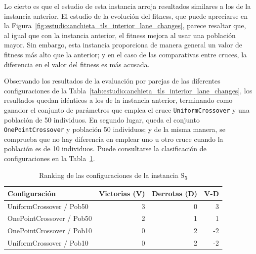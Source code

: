 Lo cierto es que el estudio de esta instancia arroja resultados similares a los de la instancia anterior. El estudio de la evolución del fitness, que puede apreciarse en la Figura~\ref{fig:estudio:anchieta_tls_interior_lane_changes}, parece resaltar que, al igual que con la instancia anterior, el fitness mejora al usar una población mayor. Sin embargo, esta instancia proporciona de manera general un valor de fitness más alto que la anterior; y en el caso de las comparativas entre cruces, la diferencia en el valor del fitness es más acusada.

Observando los resultados de la evaluación por parejas de las diferentes configuraciones de la Tabla~\ref{tab:estudio:anchieta_tls_interior_lane_changes}, los resultados quedan idénticos a los de la instancia anterior, terminando como ganador el conjunto de parámetros que emplea el cruce \texttt{UniformCrossover} y una población de 50 individuos. En segundo lugar, queda el conjunto \texttt{OnePointCrossover} y población 50 individuos; y de la misma manera, se comprueba que no hay diferencia en emplear uno u otro cruce cuando la población es de 10 individuos. Puede consultarse la clasificación de configuraciones en la Tabla~\ref{tab:rankingS5}.

\begin{table}[h]
\centering
\caption{Ranking de las configuraciones de la instancia S\textsubscript{5}}
\label{tab:rankingS5}
\begin{tabular}{lrrr}
\hline
\multicolumn{1}{l}{\textbf{Configuración}} & \textbf{Victorias (V)} & \textbf{Derrotas (D)} & \textbf{V-D} \\ \hline
UniformCrossover / Pob50                   & 3                      & 0                     & 3            \\ \hline
OnePointCrossover / Pob50                  & 2                      & 1                     & 1            \\ \hline
OnePointCrossover / Pob10                  & 0                      & 2                     & -2           \\ \hline
UniformCrossover / Pob10                   & 0                      & 2                     & -2           \\ \hline
\end{tabular}
\end{table}

